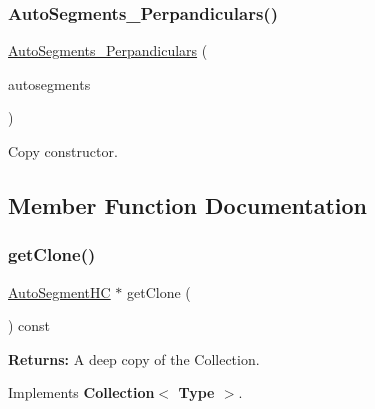 \subsubsection{\texorpdfstring{Auto\+Segments\+\_\+\+Perpandiculars()}{AutoSegments\_Perpandiculars()}\hspace{0.1cm}{\footnotesize\ttfamily [2/2]}}
{\footnotesize\ttfamily \hyperlink{classKatabatic_1_1AutoSegments__Perpandiculars}{Auto\+Segments\+\_\+\+Perpandiculars} (\begin{DoxyParamCaption}\item[{const \hyperlink{classKatabatic_1_1AutoSegments__Perpandiculars}{Auto\+Segments\+\_\+\+Perpandiculars} \&}]{autosegments }\end{DoxyParamCaption})\hspace{0.3cm}{\ttfamily [inline]}}

Copy constructor. 

\subsection{Member Function Documentation}
\mbox{\label{classKatabatic_1_1AutoSegments__Perpandiculars_a5b26b0698bdcb40cbf51b250dfb21858}} 
\subsubsection{\texorpdfstring{get\+Clone()}{getClone()}}
{\footnotesize\ttfamily \hyperlink{namespaceKatabatic_acb3628dc7705fefe38a665cfe43efa6e}{Auto\+Segment\+HC} $\ast$ get\+Clone (\begin{DoxyParamCaption}{ }\end{DoxyParamCaption}) const\hspace{0.3cm}{\ttfamily [virtual]}}

{\bfseries Returns\+:} A deep copy of the Collection. 

Implements \textbf{ Collection$<$ Type $>$}.

\mbox{\label{classKatabatic_1_1AutoSegments__Perpandiculars_a07665c070fcc269aec02ce842f384483}} 
